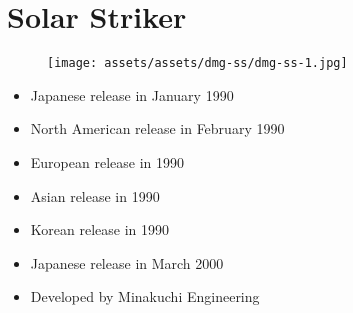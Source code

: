 \documentclass{book}
\begin{document}
\begingroup \chapter*{Solar Striker} \endgroup
\begin{figure}[H]
\vskip 4pt
\centering
\texttt{[image: assets/assets/dmg-ss/dmg-ss-1.jpg]}\end{figure}
\begin{itemize} [nosep]




\item Japanese release in January 1990







\item North American release in February 1990







\item European release in 1990







\item Asian release in 1990







\item Korean release in 1990







\item Japanese release in March 2000












\item Developed by Minakuchi Engineering

\end{itemize}\noindent
\end{document}
